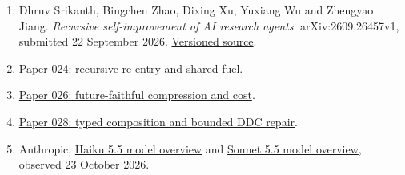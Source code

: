 \documentclass[
  11pt,
]{article}
\providecommand{\tightlist}{%
  \setlength{\itemsep}{0pt}\setlength{\parskip}{0pt}}
\begin{document}
\begin{enumerate}
\def\labelenumi{\arabic{enumi}.}
\tightlist
\item
  Dhruv Srikanth, Bingchen Zhao, Dixing Xu, Yuxiang Wu and Zhengyao
  Jiang. \emph{Recursive self-improvement of AI research agents}.
  arXiv:2609.26457v1, submitted 22 September 2026.
  \href{https://arxiv.org/abs/2609.26457v1}{Versioned source}.
\item
  \href{../024/paper.pdf}{Paper 024: recursive re-entry and shared
  fuel}.
\item
  \href{../026/paper.pdf}{Paper 026: future-faithful compression and
  cost}.
\item
  \href{../028/paper.pdf}{Paper 028: typed composition and bounded DDC
  repair}.
\item
  Anthropic,
  \href{https://platform.claude.com/docs/en/models/haiku-5-5/overview}{Haiku
  5.5 model overview} and
  \href{https://platform.claude.com/docs/en/models/sonnet-5-5/overview}{Sonnet
  5.5 model overview}, observed 23 October 2026.
\end{enumerate}
\end{document}
